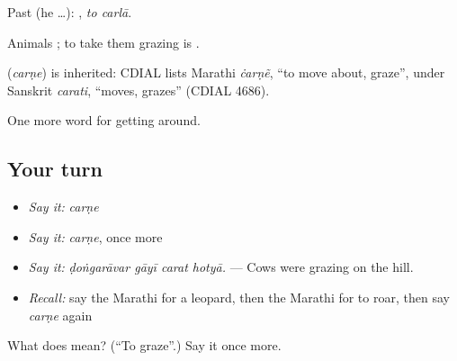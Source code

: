 Past (he …):  , \emph{to carlā}.

Animals ; to take them grazing is  .

\begin{cousinweb}
\textbf{} (\emph{carṇe}) is inherited: CDIAL lists Marathi \emph{ċarṇẽ}, \textquotedblleft{}to move about, graze\textquotedblright{}, under Sanskrit \emph{carati}, \textquotedblleft{}moves, grazes\textquotedblright{} (CDIAL 4686).
\end{cousinweb}

\begin{grammarlens}[title={What you've built}]
One more word for getting around.
\end{grammarlens}

\subsection*{Your turn}
\begin{itemize}
\raggedright
  \item \emph{Say it:} \emph{carṇe}
  \item \emph{Say it:} \emph{carṇe}, once more
  \item \emph{Say it:} \emph{ḍoṅgarāvar gāyī carat hotyā.} — Cows were grazing on the hill.
  \item \emph{Recall:} say the Marathi for a leopard, then the Marathi for to roar, then say \emph{carṇe} again
\end{itemize}

\begin{tcolorbox}[breakable,colback=teal!4,colframe=teal!35!black,title={Before you move on}]
What does  mean? (\textquotedblleft{}To graze\textquotedblright{}.) Say it once more.
\end{tcolorbox}
